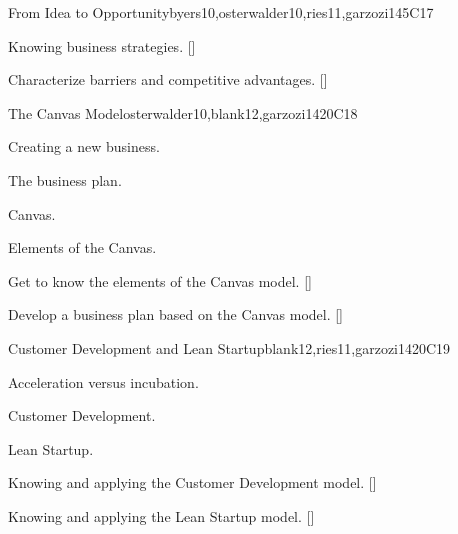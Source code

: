 \begin{syllabus}
\begin{unit}{}{From Idea to Opportunity}{byers10,osterwalder10,ries11,garzozi14}{5}{C17}
\begin{learningoutcomes} 
    \item Knowing business strategies. [\Familiarity]
    \item Characterize barriers and competitive advantages. [\Familiarity]
\end{learningoutcomes} 
\end{unit}
   
   \begin{unit}{}{The Canvas Model}{osterwalder10,blank12,garzozi14}{20}{C18}
      \begin{topics}
         \item Creating a new business.
         \item The business plan.
         \item Canvas.
         \item Elements of the Canvas.
      \end{topics}
   
     \begin{learningoutcomes} 
         \item Get to know the elements of the Canvas model. [\Usage]
         \item Develop a business plan based on the Canvas model. [\Usage]
       \end{learningoutcomes} 
   \end{unit}
   
   \begin{unit}{}{Customer Development and Lean Startup}{blank12,ries11,garzozi14}{20}{C19}
      \begin{topics}
         \item Acceleration versus incubation.
         \item Customer Development.
         \item Lean Startup.
      \end{topics}
   
      \begin{learningoutcomes} 
         \item Knowing and applying the Customer Development model. [\Usage]
         \item Knowing and applying the Lean Startup model. [\Usage]
       \end{learningoutcomes} 
   \end{unit}
   

\end{syllabus}
